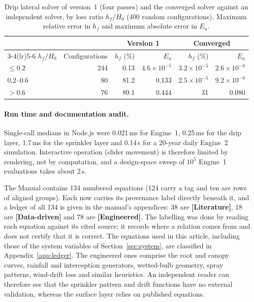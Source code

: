 \begin{table}[H]\centering\small
\caption{Drip lateral solver of version~1 (four passes) and the converged solver against an independent solver, by loss ratio $h_f/H_0$ (400 random configurations). Maximum relative error in $h_f$ and maximum absolute error in $E_u$.}
\label{tab:drip}
\begin{tabular}{lrrrrr}
\toprule
 & & \multicolumn{2}{c}{Version 1} & \multicolumn{2}{c}{Converged}\\\cmidrule(lr){3-4}\cmidrule(lr){5-6}
$h_f/H_0$ & Configurations & $h_f$ (\%) & $E_u$ & $h_f$ (\%) & $E_u$\\\midrule
$\le0.2$ & 244 & 0.13 & $4.6\times10^{-5}$ & $3.2\times10^{-5}$ & $2.6\times10^{-8}$\\
0.2--0.6 & 80 & 81.2 & 0.133 & $2.5\times10^{-5}$ & $9.2\times10^{-8}$\\
$>0.6$ & 76 & 89.1 & 0.444 & 31 & 0.080\\\bottomrule
\end{tabular}
\end{table}


\paragraph{Run time and documentation audit.}
\label{sec:audit}
Single-call medians in Node.js were 0.021\,ms for Engine~1, 0.25\,ms for the drip layer, 1.7\,ms for the sprinkler layer and 0.14\,s for a 20-year daily Engine~2 simulation. Interactive operation (slider movement) is therefore limited by rendering, not by computation, and a design-space sweep of $10^5$ Engine~1 evaluations takes about 2\,s.

The Manual contains 134 numbered equations (124 carry a tag and ten are rows of aligned groups). Each now carries its provenance label directly beneath it, and a ledger of all 134 is given in the manual's appendices: 38 are \textbf{[Literature]}, 18 are \textbf{[Data-driven]} and 78 are \textbf{[Engineered]}. The labelling was done by reading each equation against its cited source; it records where a relation comes from and does not certify that it is correct. The equations used in this article, including those of the system variables of Section~\ref{sec:system}, are classified in Appendix~\ref{app:ledger}. The engineered ones comprise the root and canopy curves, rainfall and interception generators, wetted-bulb geometry, spray patterns, wind-drift loss and similar heuristics. An independent reader can therefore see that the sprinkler pattern and drift functions have no external validation, whereas the surface layer relies on published equations.

